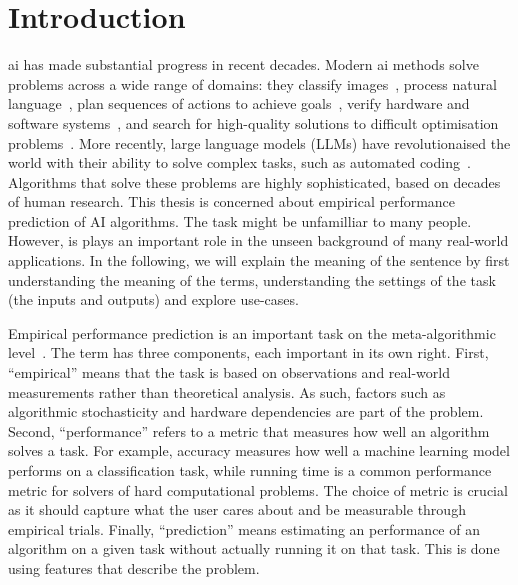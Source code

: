 
\chapter{Introduction}\label{ch:ch01:introduction}

\Gls{ai} has made substantial progress in recent decades. Modern \gls{ai} methods solve problems across a wide range of domains: they classify images~\citep{HeEtAl16}, process natural language~\citep{DevEtAl19}, plan sequences of actions to achieve goals~\citep{GerSer02}, verify hardware and software systems~\citep{BraMis10,ClaEtAl04}, and search for high-quality solutions to difficult optimisation problems~\citep{KhaEtAl17}.
More recently, large language models (LLMs) have revolutionaised the world with their ability to solve complex tasks, such as automated coding~\citep{CheEtAl21}.
Algorithms that solve these problems are highly sophisticated, based on decades of human research. This thesis is concerned about empirical performance prediction of AI algorithms. The task might be unfamilliar to many people. However, is plays an important role in the unseen background of many real-world applications. In the following, we will explain the meaning of the sentence by first understanding the meaning of the terms, understanding the settings of the task (the inputs and outputs) and explore use-cases.

Empirical performance prediction is an important task on the meta-algorithmic level~\citep{HutEtAl14}. The term has three components, each important in its own right. First, ``empirical'' means that the task is based on observations and real-world measurements rather than theoretical analysis. As such, factors such as algorithmic stochasticity and hardware dependencies are part of the problem. Second, ``performance'' refers to a metric that measures how well an algorithm solves a task. For example, accuracy measures how well a machine learning model performs on a classification task, while running time is a common performance metric for solvers of hard computational problems. The choice of metric is crucial as it should capture what the user cares about and be measurable through empirical trials. Finally, ``prediction'' means estimating an performance of an algorithm on a given task without actually running it on that task. This is done using features that describe the problem.

